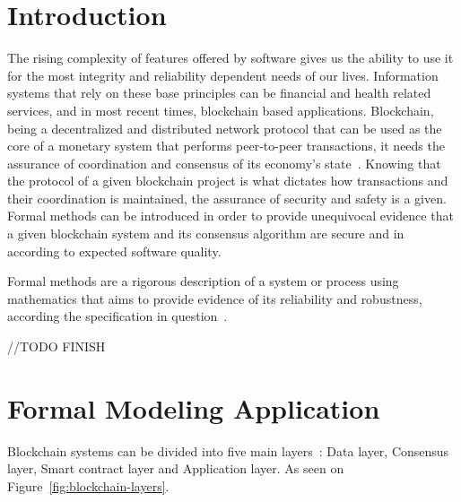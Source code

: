 \documentclass[sigconf, nonacm]{acmart}
\begin{document}
\section{Introduction}
The rising complexity of features offered by software gives us the ability to use it for the most integrity and reliability dependent needs of our lives. 
Information systems that rely on these base principles can be financial and health related services, and in most recent times, blockchain based applications. 
Blockchain, being a decentralized and distributed network protocol that can be used as the core of a monetary system that performs peer-to-peer transactions, 
it needs the assurance of coordination and consensus of its economy’s state~\cite{Duan2018}. 
Knowing that the protocol of a given blockchain project is what dictates how transactions and their coordination is maintained, the assurance of security and safety is a given. 
Formal methods can be introduced in order to provide unequivocal evidence that a given blockchain system and its consensus algorithm are secure and in according to expected software quality.

Formal methods are a rigorous description of a system or process using mathematics that aims to provide evidence of its reliability and robustness, 
according the specification in question~\cite{Regan2014}.

//TODO FINISH

\section{Formal Modeling Application}
Blockchain systems can be divided into five main layers~\cite{Duan2018}: Data layer, Consensus layer, Smart contract layer and Application layer. 
As seen on Figure~\ref{fig:blockchain-layers}.
\end{document}
